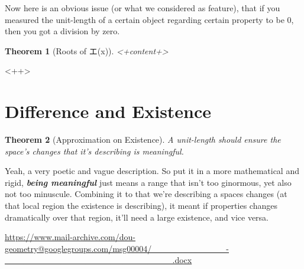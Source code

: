 \documentclass[preprint]{ptephy_v1}%
\newcommand{\jp}[1]{#1}
\newcommand{\jp}[1]{\text{#1}}
\newtheorem{theorem}{Theorem}
\begin{document}
Now here is an obvious issue (or what we considered as feature), that if you measured the unit-length of a certain object regarding certain property to be $0$, then you got a division by zero.

\begin{theorem}[Roots of \jp{エ}(x)]
    <+content+>
    \label{<+label+>}
\end{theorem}<++>

\section{Difference and Existence}
\begin{theorem}[Approximation on Existence]
    A unit-length should ensure the space's changes that it's describing is meaningful.
    \label{thm:approxExist}
\end{theorem}

Yeah, a very poetic and vague description. So put it in a more mathematical and rigid, \textit{\textbf{being meaningful}} just means a range that isn't too ginormous, yet also not too minuscule. Combining it to that we're describing a spaces changes (at that local region the existence is describing), it meant if properties changes dramatically over that region, it'll need a large existence, and vice versa.





%
%
%


\let\doi\relax


\begin{thebibliography}{9}

        \url{https://www.mail-archive.com/dou-geometry@googlegroups.com/msg00004/____________-___________________________.docx}

\end{thebibliography}

\appendix





\end{document}
